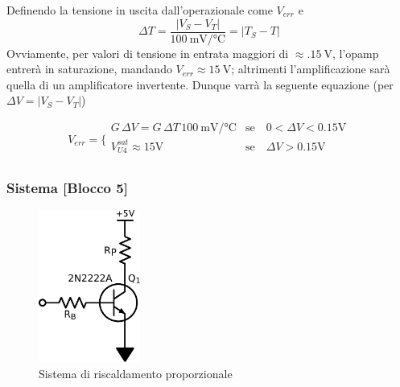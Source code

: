 Definendo la tensione in uscita dall'operazionale come $V_{err}$ e
$$\Delta T = \frac{|V_{S}-V_{T}|}{\SI{100}{\milli\volt}/\si{\celsius}}= | T_S - T | $$
Ovviamente, per valori di tensione in entrata maggiori di $\approx \SI{.15}{\volt}$, l'opamp entrerà in saturazione, mandando $V_{err}\approx \SI{15}{\volt}$; altrimenti l'amplificazione sarà quella di un amplificatore invertente.
Dunque varrà la seguente equazione (per $\Delta V = |V_S - V_T|$)

\begin{equation}
V_{err} = \bigg \{
\begin{array}{rl}
G \,\Delta V = G \,\Delta T \,\SI{100}{\milli\volt}/\si{\celsius}  & \mathrm{se} \quad 0<\Delta V<0.15 \si{\volt} \\
V_{U4}^{sat}\approx 15 \si{\volt} & \mathrm{se} \quad \Delta V>0.15 \si{\volt} \\
\end{array}
\label{eq6:exit_opamp}
\end{equation}

\subsubsection{Sistema [Blocco 5]}

\begin{figure}
\centering
\includegraphics[height=5cm]{../E06/latex/P5.pdf}
\caption{Sistema di riscaldamento proporzionale}
\label{fig6:sistema}
\end{figure}

